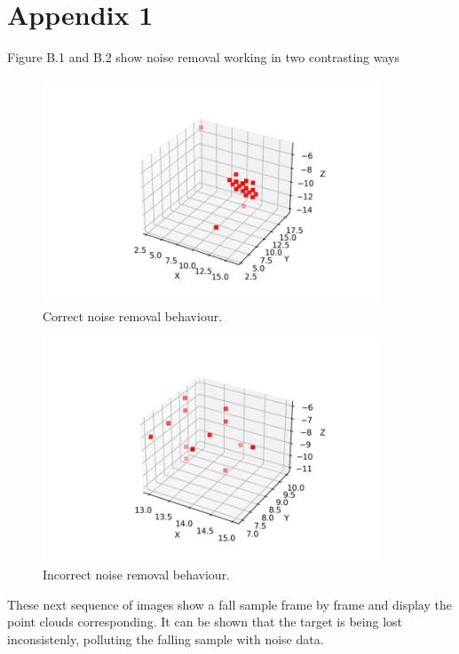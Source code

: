 \chapter{Appendix 1}\label{app1}
Figure B.1 and B.2 show noise removal working in two contrasting ways 

\begin{figure}[H]
    \centering
    \includegraphics[width=380px, keepaspectratio=true]{appendix1.jpg}
    \caption{Correct noise removal behaviour.}
    \label{fig:my_label}
\end{figure}

\begin{figure}[H]
    \centering
    \includegraphics[width=380px, keepaspectratio=true]{appendix2.jpg}
    \caption{Incorrect noise removal behaviour.}
    \label{fig:my_label}
\end{figure}

These next sequence of images show a fall sample frame by frame and display the point clouds corresponding. It can be shown that the target is being lost inconsistenly, polluting the falling sample with noise data. 

